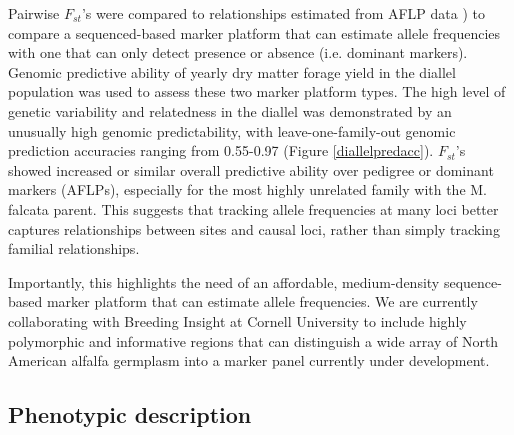 \documentclass[12pt, letterpaper]{article}
\begin{document}
Pairwise $F_{st}$'s \parencite{weir2002} were compared to relationships estimated from AFLP data \parencite[1544 AFLPs;][]{segovia2003}) to compare a sequenced-based marker platform that can estimate allele frequencies with one that can only detect presence or absence (i.e. dominant markers). Genomic predictive ability of yearly dry matter forage yield in the diallel population was used to assess these two marker platform types. The high level of genetic variability and relatedness in the diallel was demonstrated by an unusually high genomic predictability, with leave-one-family-out genomic prediction accuracies ranging from 0.55-0.97 (Figure \ref{diallelpredacc}). $F_{st}$'s showed increased or similar overall predictive ability over pedigree or dominant markers (AFLPs), especially for the most highly unrelated family with the M. falcata parent. This suggests that tracking allele frequencies at many loci better captures relationships between sites and causal loci, rather than simply tracking familial relationships. 

Importantly, this highlights the need of an affordable, medium-density sequence-based marker platform that can estimate allele frequencies. We are currently collaborating with Breeding Insight at Cornell University to include highly polymorphic and informative regions that can distinguish a wide array of North American alfalfa germplasm into a marker panel currently under development.




\subsection{Phenotypic description}
\end{document}
